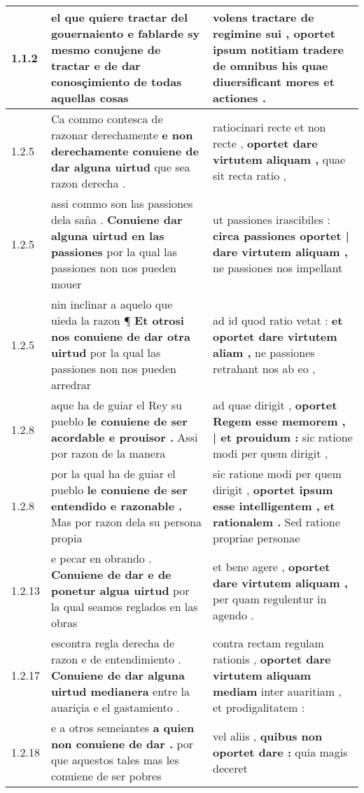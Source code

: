 \begin{tabular}{|p{1cm}|p{6.5cm}|p{6.5cm}|}

\hline
1.1.2 & el que quiere tractar del gouernaiento \textbf{ e fablarde sy mesmo conujene de tractar } e de dar conosçimiento de todas aquellas cosas & volens tractare de regimine sui , \textbf{ oportet ipsum notitiam tradere de omnibus his } quae diuersificant mores et actiones . \\\hline
1.2.5 & Ca commo contesca de razonar derechamente \textbf{ e non derechamente conuiene de dar alguna uirtud } que sea razon derecha . & ratiocinari recte et non recte , \textbf{ oportet dare virtutem aliquam , } quae sit recta ratio , \\\hline
1.2.5 & assi commo son las passiones dela saña . \textbf{ Conuiene dar alguna uirtud en las passiones } por la qual las passiones non nos pueden mouer & ut passiones irascibiles : \textbf{ circa passiones oportet | dare virtutem aliquam , } ne passiones nos impellant \\\hline
1.2.5 & nin inclinar a aquelo que uieda la razon ¶ \textbf{ Et otrosi nos conuiene de dar otra uirtud } por la qual las passiones non nos pueden arredrar & ad id quod ratio vetat : \textbf{ et oportet dare virtutem aliam , } ne passiones retrahant nos ab eo , \\\hline
1.2.8 & aque ha de guiar el Rey su pueblo \textbf{ le conuiene de ser acordable e prouisor . } Assi por razon de la manera & ad quae dirigit , \textbf{ oportet Regem esse memorem , | et prouidum : } sic ratione modi per quem dirigit , \\\hline
1.2.8 & por la qual ha de guiar el pueblo \textbf{ le conuiene de ser entendido e razonable . } Mas por razon dela su persona propia & sic ratione modi per quem dirigit , \textbf{ oportet ipsum esse intelligentem , et rationalem . } Sed ratione propriae personae \\\hline
1.2.13 & e pecar en obrando . \textbf{ Conuiene de dar e de ponetur algua uirtud } por la qual seamos reglados en las obras & et bene agere , \textbf{ oportet dare virtutem aliquam , } per quam regulentur in agendo . \\\hline
1.2.17 & escontra regla derecha de razon e de entendimiento . \textbf{ Conuiene de dar alguna uirtud medianera } entre la auariçia e el gastamiento . & contra rectam regulam rationis , \textbf{ oportet dare virtutem aliquam mediam } inter auaritiam , et prodigalitatem : \\\hline
1.2.18 & e a otros semeiantes \textbf{ a quien non conuiene de dar . } por que aquestos tales mas les conuiene de ser pobres & vel aliis , \textbf{ quibus non oportet dare : } quia magis deceret \\\hline

\end{tabular}
